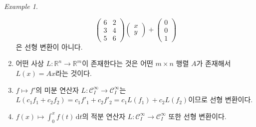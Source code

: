 \documentclass[unfonts,oneside,a4paper]{oblivoir}
\theoremstyle{definition}
\theoremstyle{theorem}
\theoremstyle{remark}
\theoremstyle{remark}
\theoremstyle{remark}
\newtheorem*{example}{Example}
\theoremstyle{remark}
\renewcommand{\vec}[1]{\bm{\mathit{#1}}}
\newcommand{\dd}{\mathrm{d}}
\begin{document}
\begin{example}
\begin{enumerate}
\begin{equation*}
\begin{pmatrix}
                    6 & 2 \\ 3 & 4 \\ 5 & 6
                    \end{pmatrix} \begin{pmatrix}
                    x \\ y
                    \end{pmatrix} + \begin{pmatrix}
                    0 \\ 0 \\ 1
                \end{pmatrix}
            \end{equation*}
            은 선형 변환이 아니다.
        \item 어떤 사상 $L: \mathbb R^n \rightarrow \mathbb R^m$이 존재한다는 것은 어떤 $m \times n$ 행렬 $A$가 존재해서 $L(\vec x) = A \vec x$라는 것이다.
        \item $f \mapsto f'$의 미분 연산자 $L: \mathcal C^\infty_I \rightarrow \mathcal C^\infty_I$는 $L(c_1 f_1 + c_2 f_2) = c_1 f'_1 + c_2 f'_2 = c_1 L(f_1) + c_2 L(f_2)$이므로 선형 변환이다.
        \item $f(x) \mapsto \int_0^x f(t)\, \dd t$의 적분 연산자 $L: \mathcal C^\infty_I \rightarrow \mathcal C^\infty_I$ 또한 선형 변환이다.
    \end{enumerate}
\end{example}
\end{document}
